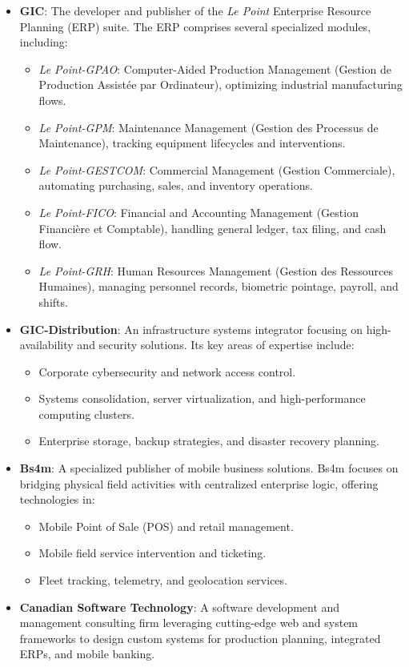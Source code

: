 \begin{itemize}
  \item \textbf{GIC}: The developer and publisher of the \emph{Le Point} Enterprise Resource Planning (ERP) suite. The ERP comprises several specialized modules, including:
  \begin{itemize}
    \item \emph{Le Point-GPAO}: Computer-Aided Production Management (Gestion de Production Assistée par Ordinateur), optimizing industrial manufacturing flows.
    \item \emph{Le Point-GPM}: Maintenance Management (Gestion des Processus de Maintenance), tracking equipment lifecycles and interventions.
    \item \emph{Le Point-GESTCOM}: Commercial Management (Gestion Commerciale), automating purchasing, sales, and inventory operations.
    \item \emph{Le Point-FICO}: Financial and Accounting Management (Gestion Financière et Comptable), handling general ledger, tax filing, and cash flow.
    \item \emph{Le Point-GRH}: Human Resources Management (Gestion des Ressources Humaines), managing personnel records, biometric pointage, payroll, and shifts.
  \end{itemize}

  \item \textbf{GIC-Distribution}: An infrastructure systems integrator focusing on high-availability and security solutions. Its key areas of expertise include:
  \begin{itemize}
    \item Corporate cybersecurity and network access control.
    \item Systems consolidation, server virtualization, and high-performance computing clusters.
    \item Enterprise storage, backup strategies, and disaster recovery planning.
  \end{itemize}

  \item \textbf{Bs4m}: A specialized publisher of mobile business solutions. Bs4m focuses on bridging physical field activities with centralized enterprise logic, offering technologies in:
  \begin{itemize}
    \item Mobile Point of Sale (POS) and retail management.
    \item Mobile field service intervention and ticketing.
    \item Fleet tracking, telemetry, and geolocation services.
  \end{itemize}

  \item \textbf{Canadian Software Technology}: A software development and management consulting firm leveraging cutting-edge web and system frameworks to design custom systems for production planning, integrated ERPs, and mobile banking.
\end{itemize}

